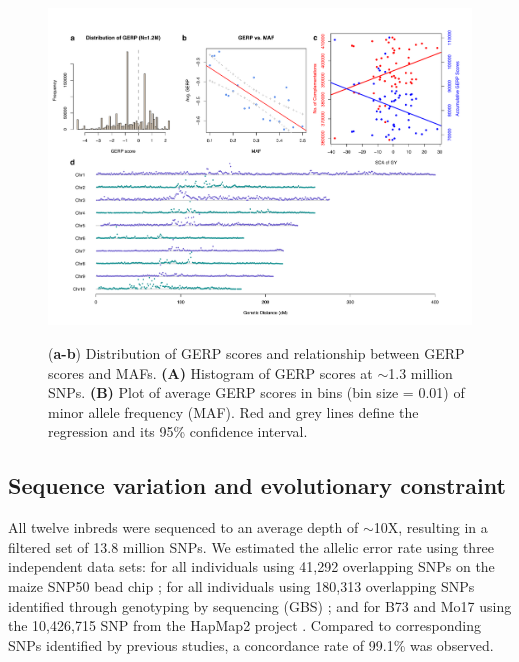 \documentclass[twoside,twocolumn, letterpaper]{article}
\renewcommand{\baselinestretch}{1}
\newcommand{\jri}[1]{\textcolor{red}{ \emph{ #1}} }
\begin{document}
\begin{figure}[tbh]   
  \begin{center}
   \vspace{-2mm}
   \includegraphics[width=0.8\linewidth]{Fig2_gerp.pdf}
   \renewcommand{\baselinestretch}{0.9}
   \vspace{-3mm}
   \caption{({\bfseries a-b}) Distribution of GERP scores and relationship between GERP scores and MAFs. \textbf{(A)} Histogram of GERP scores at $\sim$1.3 million SNPs. \textbf{(B)} Plot of average GERP scores in bins (bin size = 0.01) of minor allele frequency (MAF). Red and grey lines define the regression and its 95\% confidence interval.} 
\vspace{-4mm}
    \label{fig:gerp}
  \end{center}
\end{figure}

\subsection*{Sequence variation and evolutionary constraint}

All twelve inbreds were sequenced to an average depth of $\sim$10X, resulting in a filtered set of 13.8 million SNPs. 
We estimated the allelic error rate using three independent data sets: for all individuals using 41,292 overlapping SNPs on the maize SNP50 bead chip \citep{Heerwaarden2012}; for all individuals using 180,313 overlapping SNPs identified through genotyping by sequencing (GBS) \citep{Romay2013}; and for B73 and Mo17 using the 10,426,715 SNP from the HapMap2 project \citep{Chia2012}.  Compared to corresponding SNPs identified by previous studies, a concordance rate of 99.1\% was observed. %
\end{document}
